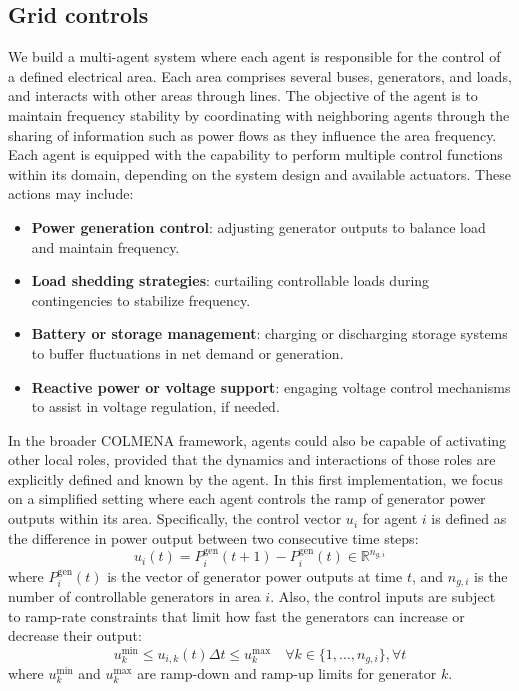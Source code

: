 \documentclass{article}
\begin{document}
\subsection{Grid controls}
We build a multi-agent system where each agent is responsible for the control of a defined electrical area. Each area comprises several buses, generators, and loads, and interacts with other areas through lines. The objective of the agent is to maintain frequency stability by coordinating with neighboring agents through the sharing of information such as power flows as they influence the area frequency. Each agent is equipped with the capability to perform multiple control functions within its domain, depending on the system design and available actuators. These actions may include:
\begin{itemize}
    \item \textbf{Power generation control}: adjusting generator outputs to balance load and maintain frequency.
    \item \textbf{Load shedding strategies}: curtailing controllable loads during contingencies to stabilize frequency.
    \item \textbf{Battery or storage management}: charging or discharging storage systems to buffer fluctuations in net demand or generation.
    \item \textbf{Reactive power or voltage support}: engaging voltage control mechanisms to assist in voltage regulation, if needed.
\end{itemize}

In the broader COLMENA framework, agents could also be capable of activating other local roles, provided that the dynamics and interactions of those roles are explicitly defined and known by the agent. In this first implementation, we focus on a simplified setting where each agent controls the ramp of generator power outputs within its area. Specifically, the control vector \( u_i \) for agent \( i \) is defined as the difference in power output between two consecutive time steps:
\begin{equation}
    u_i(t) = P^{\text{gen}}_i(t+1) - P^{\text{gen}}_i(t) \in \mathbb{R}^{n_{g,i}}
\end{equation}
where \( P^{\text{gen}}_i(t) \) is the vector of generator power outputs at time \( t \), and \( n_{g,i} \) is the number of controllable generators in area \( i \). Also, the control inputs are subject to ramp-rate constraints that limit how fast the generators can increase or decrease their output:
\begin{equation}
    u^{\min}_{k} \leq u_{i,k}(t)  \Delta  t \leq u^{\max}_{k} \quad \forall k \in \{1, \dots, n_{g,i}\}, \forall t
\end{equation}
where \( u^{\min}_{k} \) and \( u^{\max}_{k} \) are ramp-down and ramp-up limits for generator \( k \). 
\end{document}
